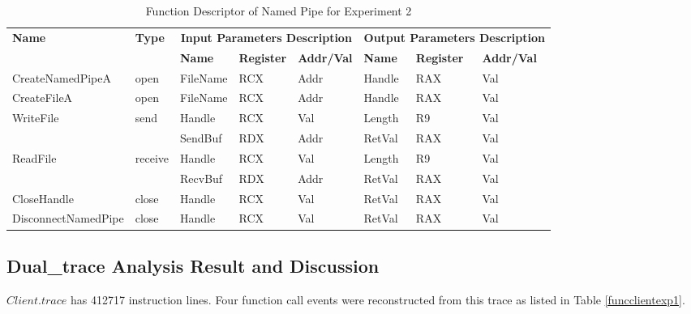 \begin{table}[H]
  \centering
  \caption{Function Descriptor of Named Pipe for Experiment 2}
  \label{fdescexp1}
  \begin{tabular}{|l|l|l|l|l|l|l|l|}
\hline
             \multirow{2}{*}{{\textbf{Name}}} & \multirow{2}{*}{{\textbf{Type}}} & \multicolumn{3}{c|}{\textbf{Input Parameters Description}} & \multicolumn{3}{c|}{\textbf{Output Parameters Description}} \\
              \cline{3-8} 
             & & \textbf{Name}& \textbf{Register} & \textbf{Addr/Val} & \textbf{Name}& \textbf{Register} &  \textbf{Addr/Val}  \\
             \hline
      CreateNamedPipeA
       &open & FileName & RCX  & Addr &  Handle & RAX & Val\\
      \hline         
      CreateFileA
       &open & FileName & RCX & Addr&  Handle & RAX & Val\\ 
      \hline              
      \multirow{2}{*}{WriteFile}
       &\multirow{2}{*}{send} &  Handle & RCX & Val & Length& R9 &Val\\
        \cline{3-8} 
       & & SendBuf & RDX & Addr & RetVal& RAX & Val\\
      \hline            
      \multirow{2}{*}{ReadFile}
       &\multirow{2}{*}{receive} &  Handle & RCX & Val& Length &R9 & Val\\
        \cline{3-8} 
       & & RecvBuf & RDX  & Addr & RetVal& RAX & Val\\
      \hline            
      CloseHandle &
       close &  Handle & RCX & Val & RetVal& RAX & Val\\
      \hline            
      DisconnectNamedPipe &
      close &  Handle & RCX & Val & RetVal& RAX & Val\\
      \hline               
  \end{tabular}
\end{table}



\subsection{Dual\_trace Analysis Result and Discussion}
$Client.trace$ has 412717 instruction lines. Four function call events were reconstructed from this trace as listed in Table \ref{funcclientexp1}.

